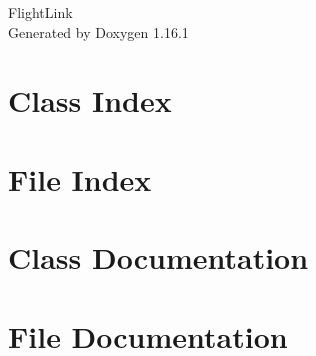 \documentclass[twoside]{book}
\newcommand{\+}{\discretionary{\mbox{\scriptsize$\hookleftarrow$}}{}{}}
\newcommand{\clearemptydoublepage}{%
    \newpage{\pagestyle{empty}\cleardoublepage}%
  }
\begin{document}
  \raggedbottom
    \hypersetup{pageanchor=false,
                bookmarksnumbered=true,
                pdfencoding=unicode
               }
  \begin{titlepage}
  \vspace*{7cm}
  \begin{center}%
  {\Large Flight\+Link}\\
  \vspace*{1cm}
  {\large Generated by Doxygen 1.16.1}\\
  \end{center}
  \end{titlepage}
  \clearemptydoublepage
  \tableofcontents
  \clearemptydoublepage
  \hypersetup{pageanchor=true}
\chapter{Class Index}

\chapter{File Index}

\chapter{Class Documentation}








\chapter{File Documentation}








  \backmatter
  \newpage
  \clearemptydoublepage
  \printindex
\end{document}
